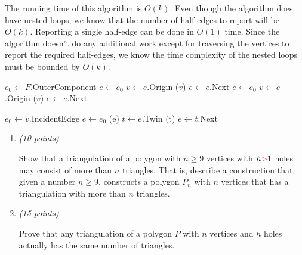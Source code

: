 \documentclass{article}
\newcommand{\withpoints}[1]{%
  \addtocounter{pointscounter}{#1} \printpoints{#1}
}
\newcommand{\printpoints}[1]{%
   \ifthenelse{#1 = 0}
              {}
              {\textit{(#1 points)}}\mbox{}
}
\newenvironment{question}[1][0]{\begin{tcolorbox}[parbox=false
                                      ,breakable=true
                                      ,enhanced jigsaw
                                      ,title=\bfseries Question
                                      \stepcounter{questionscounter}\arabic{questionscounter}
                                      \withpoints{#1}]
                         }
                         {\end{tcolorbox}}
\newenvironment{subquestions}{\begin{enumerate}[leftmargin=*
                                        ]}
                             {\end{enumerate}}
\newcommand{\subquestion}[1][0]{\item \withpoints{#1}}
\begin{document}
  The running time of this algorithm is $O(k)$. 
  Even though the algorithm does have nested loops, we know that the number of half-edges to report will be $O(k)$.
  Reporting a single half-edge can be done in $O(1)$ time.
  Since the algorithm doesn't do any additional work except for traversing the vertices to report the required half-edges, 
  we know the time complexity of the nested loops must be bounded by $O(k)$. \\

  \begin{algorithmic}
      \State $e_0 \gets F$.OuterComponent
      \State $e \gets e_0$
        \State $v \gets e$.Origin
        \State {}($v$)
        \State $e \gets e$.Next
      \EndWhile
      \State
        \State $e \gets e_0$
          \State $v \gets e$.Origin
          \State {}($v$)
          \State $e \gets e$.Next
        \EndWhile
      \EndFor
    \EndFunction
  \end{algorithmic} 

  \vspace{.2cm}

  \begin{algorithmic}
      \State $e_0 \gets v$.IncidentEdge 
      \State $e \gets e_0$
        \State {}(e)
        \State $t \gets e$.Twin
        \State {}(t)
        \State $e \gets t$.Next
      \EndWhile
    \EndFunction
  \end{algorithmic}
  

  \begin{question}
    \begin{subquestions}
      \subquestion[10] Show that a triangulation of a polygon with
      $n \geq 9$ vertices with $h {\color{red}{>}} 1$ holes may consist of more than $n$
      triangles. That is, describe a construction that, given a number
      $n \geq 9$, constructs a polygon $P_n$ with $n$ vertices that
      has a triangulation with more than $n$ triangles.

      \subquestion[15] Prove that any triangulation of a polygon $P$
      with $n$ vertices and $h$ holes actually has the same number of
      triangles.
    \end{subquestions}
  \end{question}
\end{document}
